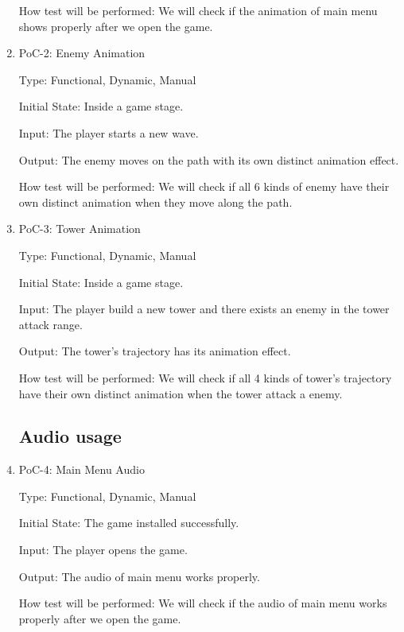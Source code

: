 \documentclass[12pt]{article}
\begin{document}
\begin{enumerate}
	How test will be performed: We will check if the animation of main menu shows properly after we open the game.
	
	 \item{PoC-2: Enemy Animation}
    
    Type: Functional, Dynamic, Manual
    
    Initial State: Inside a game stage.
    
    Input: The player starts a new wave.
    
    Output: The enemy moves on the path with its own distinct animation effect.
    
    How test will be performed: We will check if all 6 kinds of enemy have their own distinct animation when they move along the path.
    
    \item{PoC-3: Tower Animation}
    
    Type: Functional, Dynamic, Manual
    
    Initial State: Inside a game stage.
    
    Input: The player build a new tower and there exists an enemy in the tower attack range.
    
    Output: The tower's trajectory has its animation effect.
    
    How test will be performed: We will check if all 4 kinds of tower's trajectory have their own distinct animation when the tower attack a enemy.
    
    




\subsection{Audio usage}

    \item{PoC-4: Main Menu Audio}
					
	Type: Functional, Dynamic, Manual
					
    Initial State: The game installed successfully.
					
	Input: The player opens the game.
					
	Output: The audio of main menu works properly.
					
	How test will be performed: We will check if the audio of main menu works properly after we open the game.
	
	






\end{enumerate}
\end{document}
